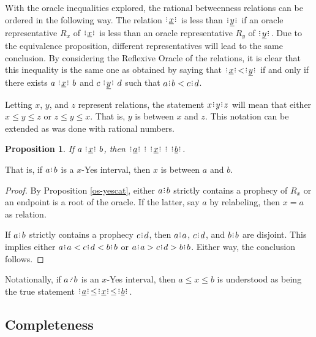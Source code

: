 \documentclass[12pt]{article}
\newtheorem{proposition}{Proposition}[section]
\begin{document}
With the oracle inequalities explored, the rational betweenness relations can be ordered in the following way. The relation $\xrel$ is less than $\xrel[y]$ if an oracle representative $R_x$ of $\xrel$ is less than an oracle representative $R_y$ of $\xrel[y]$. Due to the equivalence proposition, different representatives will lead to the same conclusion. By considering the Reflexive Oracle of the relations, it is clear that this inequality is the same one as obtained by saying that $\xrel \hspace{0.5pt} < \hspace{0.5pt} \xrel[y]$ if and only if there exists $a \xrel b$ and $c \xrel[y] d$ such that $a\rint b < c\rint d$. 

Letting $x$, $y$, and $z$ represent relations, the statement $x\rint y\rint z$ will mean that either $x \leq y \leq z$ or $z \leq y \leq x$. That is, $y$ is between $x$ and $z$. This notation can be extended as was done with rational numbers. 

\begin{proposition}
    If $a \xrel b$, then $\xrel[a] \rint  \xrel \rint  \xrel[b]$.
\end{proposition}

That is, if $a\rint b$ is a $x$-Yes interval, then $x$ is between $a$ and $b$.

\begin{proof}
    By Proposition \ref{os-yescat}, either $a \rint b$ strictly contains a prophecy of $R_x$ or an endpoint is a root of the oracle. If the latter, say $a$ by relabeling, then $x = a$ as relation. 

    If $a\rint b$ strictly contains a prophecy $c\rint d$, then $a\rint a$, $c\rint d$, and $b\rint b$ are disjoint. This implies either $a\rint a < c\rint d < b\rint b$ or $a\rint a > c\rint d > b\rint b$. Either way, the conclusion follows.  
\end{proof}

Notationally, if $a \lte b$ is an $x$-Yes interval, then $a \leq x \leq b$ is understood as being the true statement $\xrel[a] \hspace{0.5pt} \leq \hspace{0.5pt} \xrel \hspace{0.5pt} \leq  \hspace{0.5pt} \xrel[b]$. 


\subsection{Completeness}
\end{document}
